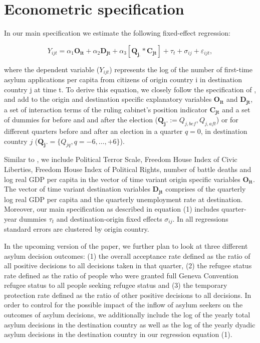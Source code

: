 \documentclass[a4paper,12pt]{article}
\begin{document}



\section{Econometric specification} \label{sec:econometric}
In our main specification we estimate the following fixed-effect regression:

\begin{equation}
Y_{ijt} =\alpha_1 \mathbf{O_{it}} + \alpha_2 \mathbf{D_{jt}} + \alpha_3 [\mathbf{Q_{j.}} *  \mathbf{C_{jt}}] + \tau_t + \sigma_{ij} +  \varepsilon_{ijt},
\end{equation}

where the dependent variable ($Y_{ijt}$) represents the log of the number of first-time asylum applications per capita from citizens of origin country i in destination country j at time t. To derive this equation, we closely follow the specification of \cite{hatton2016}, and add to the origin and destination specific explanatory variables $\mathbf{O_{it}}$ and $\mathbf{D_{jt}}$, a set of interaction terms of the ruling cabinet's position indicator $\mathbf{C_{jt}}$
 and  a set of dummies for before and and after the election ($\mathbf{Q_j.} := Q_{j,bef},  Q_{j,aft}$) or for different quarters before and after an election in a quarter $q=0$, in destination country $j$ ($\mathbf{Q_j.} =\{Q_{jq}, q = -6, \ldots, +6\}$).
 

  Similar to \cite{hatton2016}, we include Political Terror Scale, Freedom House Index of Civic Liberties, Freedom House Index of  Political Rights, number of battle deaths and log real GDP per capita in the vector of time variant origin specific variables $\mathbf{O_{it}}$. The vector of time variant destination variables $\mathbf{D_{jt}}$ comprises of the quarterly log real GDP per capita and the quarterly unemployment rate at destination. Moreover, our main specification as described in equation (1) includes quarter-year dummies $\tau_t$ and destination-origin fixed effects $\sigma_{ij}$. In all regressions standard errors are clustered by origin country.

 
 In the upcoming version of the paper, we further plan to look at three different asylum decision outcomes: (1) the overall acceptance rate defined as the ratio of all positive decisions to all decisions taken in that quarter, (2) the refugee status rate defined as the ratio of people who were granted full Geneva Convention refugee status to all people seeking refugee status and (3) the temporary protection rate defined as the ratio of other positive decisions to all decisions.  In order to control for the possible impact of the inflow of asylum seekers on the outcomes of asylum decisions, we additionally include  the log of the yearly total asylum decisions in the destination country as well as the log of  the yearly dyadic asylum decisions in the destination country in our regression equation (1). 
\end{document}
